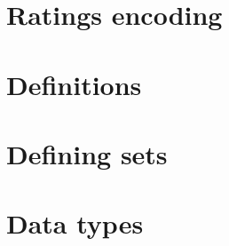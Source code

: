 
\section*{Ratings encoding}

\vfill
\section*{Definitions}

\vfill
\section*{Defining sets}

\vfill
\section*{Data types}

\vfill
